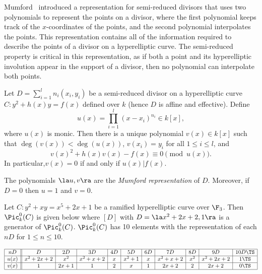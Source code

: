 \ee

Mumford~\cite{mumford_tata2_1984} introduced a representation for semi-reduced
divisors that uses two polynomials to represent the points on a divisor, where
the first polynomial keeps track of the $x$-coordinates of the points, and the
second polynomial interpolates the points. This representation contains all of
the information required to describe the points of a divisor on a hyperelliptic
curve.  The semi-reduced property is critical in this representation, as if both
a point and its hyperelliptic involution appear in the support of a divisor,
then no polynomial can interpolate both points. 

\bd\label{def:mumford}
\cite[Adapted from Lemma~10.3.5 and Definition~10.3.6]{Galbraith_PKC_2012} Let
$D = \sum^l_{i=1} n_i(x_i,y_i)$ be a semi-reduced divisor on a hyperelliptic
curve $C : y^2 + h(x)y = f(x)$ defined over $k$ (hence $D$ is affine and effective).
Define $$ u(x) = \prod^l_{i=1}(x - x_i)^{n_i} \in k[x],$$ where $u(x)$ is monic.
Then there is a unique polynomial $v(x) \in k[x]$ such that $\deg(v(x)) <
\deg(u(x))$, $v(x_i) = y_i$ for all $1\leq i \leq l$, and \begin{equation}
v(x)^2 + h(x)v(x) - f(x) \equiv 0 \pmod{u(x)}. \end{equation}
\label{eq:hyperelliptic} In particular,$v(x) = 0$ if and only if $u(x) | f(x)$.

The polynomials $\la u,v \ra$ are the \emph{Mumford representation} of $D$.
Moreover, if $D = 0$ then $u = 1$ and $v = 0$.
\ed


\be\label{ex:dcg} Let $C : y^2 + xy = x^5 + 2x + 1$ be a ramified hyperelliptic
curve over $\F_3$. Then $\Pic^0_k(C)$ is given below where
$[D]$ with $ D = \la x^2 + 2x + 2,1 \ra$ is a generator of $\Pic^0_k(C)$.
$\Pic^0_k(C)$ has 10 elements with the representation of each $nD$ for
$1 \leq n \leq 10$.
\renewcommand{\arraycolsep}{3pt}
\begin{table}[ht]\label{tab:dcgf3}
  \[ \begin{array}{|c||c|c|c|c|c|c|c|c|c|c|} 
    \hline
nD&D&2D&3D&4D&5D&6D&7D&8D&9D&10D \TS\\
\hline
    u(x)&x^2+2x+2&x^2 &x^2+x+2&x&x^2+1&x&x^2+x+2&x^2&x^2+2x+2&1 \TS\\ \hline 
    v(x)&1       &2x+1&1      &2&x    &1&2x + 2 &2  &2x+2    &0 \TS\\ \hline
  \end{array} \]
  \end{table}
\ee



